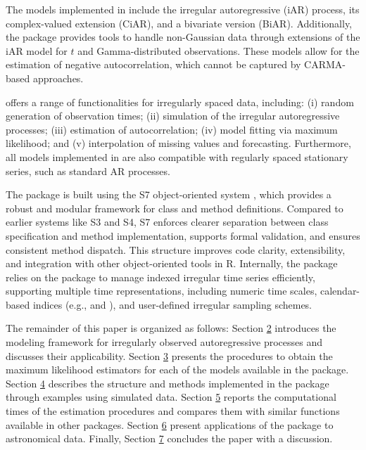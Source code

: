 The models implemented in  include the irregular autoregressive (iAR) process, its complex-valued extension (CiAR), and a bivariate version (BiAR). Additionally, the package provides tools to handle non-Gaussian data through extensions of the iAR model for \(t\) and Gamma-distributed observations. These models allow for the estimation of negative autocorrelation, which cannot be captured by CARMA-based approaches.

 offers a range of functionalities for irregularly spaced data, including: (i) random generation of observation times; (ii) simulation of the irregular autoregressive processes; (iii) estimation of autocorrelation; (iv) model fitting via maximum likelihood; and (v) interpolation of missing values and forecasting. Furthermore, all models implemented in  are also compatible with regularly spaced stationary series, such as standard AR processes.

The package is built using the S7 object-oriented system \citep{VaughanHesterKalinowskiLandauLawrenceMaechlerTierneyWickham2024}, which provides a robust and modular framework for class and method definitions. Compared to earlier systems like S3 and S4, S7 enforces clearer separation between class specification and method implementation, supports formal validation, and ensures consistent method dispatch. This structure improves code clarity, extensibility, and integration with other object-oriented tools in R. Internally, the package relies on the  package \citep{ZeileisGrothendieck2005} to manage indexed irregular time series efficiently, supporting multiple time representations, including numeric time scales,
calendar-based indices (e.g.,  and ), and user-defined irregular sampling schemes.

The remainder of this paper is organized as follows:
Section \hyperref[models]{2} introduces the modeling framework for irregularly observed autoregressive processes and discusses their applicability.
Section \hyperref[sec:estimation]{3} presents the procedures to obtain the maximum likelihood estimators for each of the models available in the  package.
Section \hyperref[sec:usage]{4} describes the structure and methods implemented in the package through examples using simulated data.
Section \hyperref[sec:cpu]{5} reports the computational times of the estimation procedures and compares them with similar functions available in other packages.
Section \hyperref[sec:applications]{6} present applications of the  package to astronomical data.
Finally, Section \hyperref[sec:discussion]{7} concludes the paper with a discussion.

